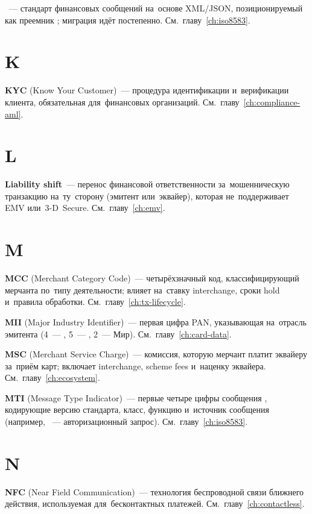 \textbf{}~--- стандарт финансовых сообщений
на~основе XML/JSON, позиционируемый как преемник ;
миграция идёт постепенно. См.~главу~\ref{ch:iso8583}.


\section*{K}

\textbf{KYC} (Know Your Customer)~--- процедура идентификации
и~верификации клиента, обязательная для~финансовых
организаций. См.~главу~\ref{ch:compliance-aml}.


\section*{L}

\textbf{Liability shift}~--- перенос финансовой ответственности
за~мошенническую транзакцию на~ту~сторону (эмитент или~эквайер),
которая не~поддерживает EMV или~3-D~Secure. См.~главу~\ref{ch:emv}.


\section*{M}

\textbf{MCC} (Merchant Category Code)~--- четырёхзначный код,
классифицирующий мерчанта по~типу деятельности; влияет на~ставку
interchange, сроки hold и~правила
обработки. См.~главу~\ref{ch:tx-lifecycle}.

\textbf{MII} (Major Industry Identifier)~--- первая цифра PAN,
указывающая на~отрасль эмитента (4~--- ,
5~--- , 2~--- Мир). См.~главу~\ref{ch:card-data}.

\textbf{MSC} (Merchant Service Charge)~--- комиссия, которую
мерчант платит эквайеру за~приём карт; включает interchange,
scheme fees и~наценку эквайера. См.~главу~\ref{ch:ecosystem}.

\textbf{MTI} (Message Type Indicator)~--- первые четыре цифры
сообщения , кодирующие версию стандарта, класс,
функцию и~источник сообщения (например, ~---
авторизационный запрос). См.~главу~\ref{ch:iso8583}.


\section*{N}

\textbf{NFC} (Near Field Communication)~--- технология
беспроводной связи ближнего действия, используемая
для~бесконтактных платежей. См.~главу~\ref{ch:contactless}.


